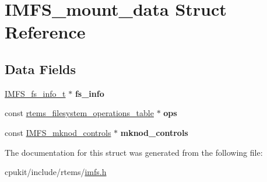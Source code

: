 \hypertarget{structIMFS__mount__data}{}\section{I\+M\+F\+S\+\_\+mount\+\_\+data Struct Reference}
\label{structIMFS__mount__data}
\subsection*{Data Fields}
\begin{DoxyCompactItemize}
\item 
\mbox{\label{structIMFS__mount__data_a1efb1a6083e011afdd4ce54e2e248048}} 
\mbox{\hyperlink{structIMFS__fs__info__t}{I\+M\+F\+S\+\_\+fs\+\_\+info\+\_\+t}} $\ast$ {\bfseries fs\+\_\+info}
\item 
\mbox{\label{structIMFS__mount__data_aa53852db00b4622a493d7955d9622c59}} 
const \mbox{\hyperlink{struct__rtems__filesystem__operations__table}{rtems\+\_\+filesystem\+\_\+operations\+\_\+table}} $\ast$ {\bfseries ops}
\item 
\mbox{\label{structIMFS__mount__data_af41cfb662fc6d1d61a882d3a964fb0df}} 
const \mbox{\hyperlink{structIMFS__mknod__controls}{I\+M\+F\+S\+\_\+mknod\+\_\+controls}} $\ast$ {\bfseries mknod\+\_\+controls}
\end{DoxyCompactItemize}


The documentation for this struct was generated from the following file\+:\begin{DoxyCompactItemize}
\item 
cpukit/include/rtems/\mbox{\hyperlink{imfs_8h}{imfs.\+h}}\end{DoxyCompactItemize}

